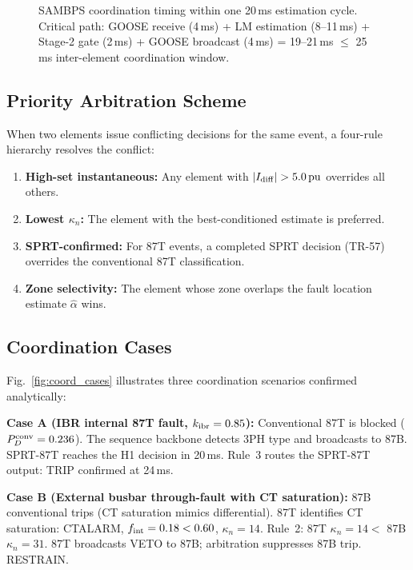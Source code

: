 \documentclass[journal,twoside]{IEEEtran}
\begin{document}
\begin{figure}[t]
  \centering
  \resizebox{\columnwidth}{!}{}
  \caption{SAMBPS coordination timing within one 20\,ms estimation cycle.
    Critical path: GOOSE receive (4\,ms) + LM estimation (8--11\,ms) +
    Stage-2 gate (2\,ms) + GOOSE broadcast (4\,ms) = 19--21\,ms $\leq$ 25\,ms
    inter-element coordination window.}
  \label{fig:timeline}
\end{figure}

\subsection{Priority Arbitration Scheme}

When two elements issue conflicting decisions for the same event, a four-rule
hierarchy resolves the conflict:
\begin{enumerate}
  \item \textbf{High-set instantaneous:} Any element with
    $|I_{\rm diff}| > 5.0\,\text{pu}$ overrides all others.
  \item \textbf{Lowest $\kappa_n$:} The element with the best-conditioned
    estimate is preferred.
  \item \textbf{SPRT-confirmed:} For 87T events, a completed SPRT decision
    (TR-57) overrides the conventional 87T classification.
  \item \textbf{Zone selectivity:} The element whose zone overlaps the fault
    location estimate $\hat{\alpha}$ wins.
\end{enumerate}

\subsection{Coordination Cases}

Fig.~\ref{fig:coord_cases} illustrates three coordination scenarios confirmed
analytically:

\textbf{Case A (IBR internal 87T fault, $k_{\rm ibr} = 0.85$):}
Conventional 87T is blocked ($P_D^{\rm conv} = 0.236$).
The sequence backbone detects 3PH type and broadcasts to 87B.
SPRT-87T reaches the H1 decision in 20\,ms.
Rule~3 routes the SPRT-87T output: TRIP confirmed at 24\,ms.

\textbf{Case B (External busbar through-fault with CT saturation):}
87B conventional trips (CT saturation mimics differential).
87T identifies CT saturation: CTALARM, $f_{\rm int} = 0.18 < 0.60$,
$\kappa_n = 14$.
Rule~2: 87T $\kappa_n = 14 < $ 87B $\kappa_n = 31$.
87T broadcasts VETO to 87B; arbitration suppresses 87B trip. RESTRAIN.
\end{document}
